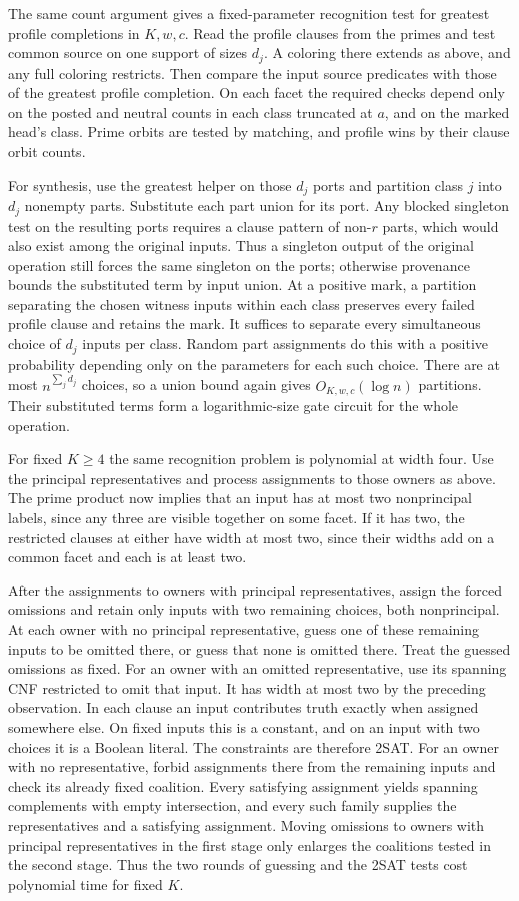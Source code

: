 The same count argument gives a fixed-parameter recognition
test for greatest profile completions in $K,w,c$. Read the
profile clauses from the primes and test common source on
one support of sizes $d_j$. A coloring there extends as
above, and any full coloring restricts. Then compare the
input source predicates with those of the greatest profile
completion. On each facet the required checks depend only
on the posted and neutral counts in each class truncated at
$a$, and on the marked head's class. Prime orbits are tested
by matching, and profile wins by their clause orbit counts.

For synthesis, use the greatest helper on those $d_j$
ports and partition class $j$ into $d_j$ nonempty parts.
Substitute each part union for its port. Any blocked
singleton test on the resulting ports requires a clause
pattern of non-$r$ parts, which would also exist among the
original inputs. Thus a singleton output of the original
operation still forces the same singleton on the ports;
otherwise provenance bounds the substituted term by input
union. At a positive mark, a partition separating the chosen
witness inputs within each class preserves every failed
profile clause and retains the mark. It suffices to separate
every simultaneous choice of $d_j$ inputs per class. Random
part assignments do this with a positive probability
depending only on the parameters for each such choice.
There are at most $n^{\sum_j d_j}$ choices, so a union
bound again gives $O_{K,w,c}(\log n)$ partitions. Their
substituted terms form a logarithmic-size gate circuit
for the whole operation.

For fixed $K\ge4$ the same recognition problem is polynomial
at width four. Use the principal representatives and process
assignments to those owners as above. The prime product now
implies that an input has at most two nonprincipal labels,
since any three are visible together on some facet. If it has
two, the restricted clauses at either have width at most two,
since their widths add on a common facet and each is at least
two.

After the assignments to owners with principal representatives,
assign the forced omissions and retain only inputs with two
remaining choices, both nonprincipal. At each owner with no
principal representative, guess one of these remaining inputs
to be omitted there, or guess that none is omitted there.
Treat the guessed omissions as fixed. For an owner with an
omitted representative, use its spanning CNF restricted to
omit that input. It has width at most two by the preceding
observation. In each clause an input contributes truth exactly
when assigned somewhere else. On fixed inputs this is a
constant, and on an input with two choices it is a Boolean
literal. The constraints are therefore 2SAT. For an owner
with no representative, forbid assignments there from the
remaining inputs and check its already fixed coalition.
Every satisfying assignment yields spanning complements
with empty intersection, and every such family supplies the
representatives and a satisfying assignment. Moving omissions
to owners with principal representatives in the first stage
only enlarges the coalitions tested in the second stage.
Thus the two rounds of guessing and the 2SAT tests cost
polynomial time for fixed $K$.

